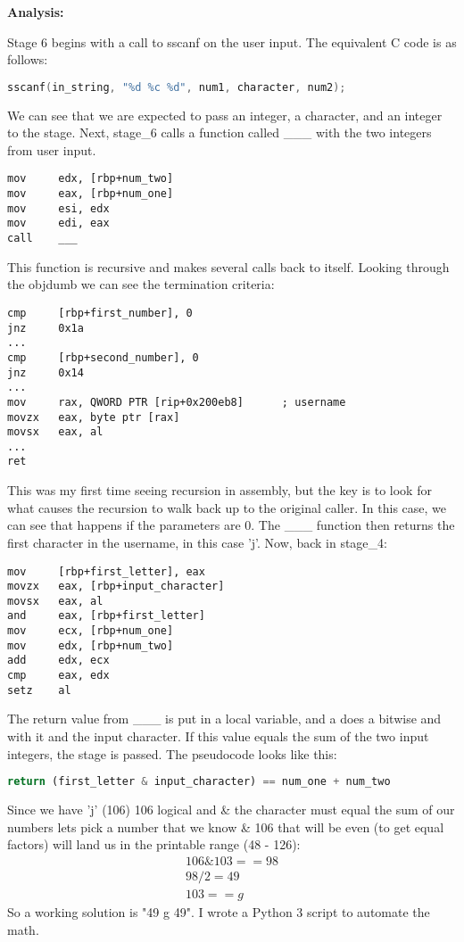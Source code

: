 \documentclass{article}
\begin{document}
\begin{flushleft}
\textbf{Analysis:}
\vspace{.5pc}
\end{flushleft}
\par
Stage 6 begins with a call to sscanf on the user input.  The equivalent C code
is as follows:
\begin{lstlisting}[language=C]
sscanf(in_string, "%d %c %d", num1, character, num2);
\end{lstlisting}
\par
We can see that we are expected to pass an integer, a character, and an 
integer to the stage.  Next, stage\_6 calls a function called \_\_\_ with the 
two integers from user input.
\begin{lstlisting}
mov     edx, [rbp+num_two]
mov     eax, [rbp+num_one]
mov     esi, edx
mov     edi, eax
call    ___
\end{lstlisting}
This function is recursive and makes several calls back to itself.  Looking 
through the objdumb we can see the termination criteria:
\begin{lstlisting}
cmp     [rbp+first_number], 0
jnz     0x1a
...
cmp     [rbp+second_number], 0
jnz     0x14
...
mov     rax, QWORD PTR [rip+0x200eb8]      ; username
movzx   eax, byte ptr [rax]
movsx   eax, al
...
ret
\end{lstlisting}
\par
This was my first time seeing recursion in assembly, but the key is to look
for what causes the recursion to walk back up to the original caller.  In this
case, we can see that happens if the parameters are 0.  The \_\_\_ function
then returns the first character in the username, in this case 'j'.  Now, back
in stage\_4:
\begin{lstlisting}
mov     [rbp+first_letter], eax
movzx   eax, [rbp+input_character]
movsx   eax, al
and     eax, [rbp+first_letter]
mov     ecx, [rbp+num_one]
mov     edx, [rbp+num_two]
add     edx, ecx
cmp     eax, edx
setz    al
\end{lstlisting}
\par
The return value from \_\_\_ is put in a local variable, and a does a bitwise
and with it and the input character.  If this value equals the sum of the two
input integers, the stage is passed.  The pseudocode looks like this:
\begin{lstlisting}[language=Python]
return (first_letter & input_character) == num_one + num_two
\end{lstlisting}
\par
Since we have 'j' (106) 106 logical and \& the character must equal the sum of
our numbers lets pick a number that we know \& 106 that will be even (to get 
equal factors) will land us in the printable range (48 - 126):
\begin{align*}
        106 \& 103 == 98\\
        98 / 2 = 49\\
        103 == g
\end{align*}
So a working solution is "49 g 49".  I wrote a Python 3 script to automate the 
math.
\end{document}
